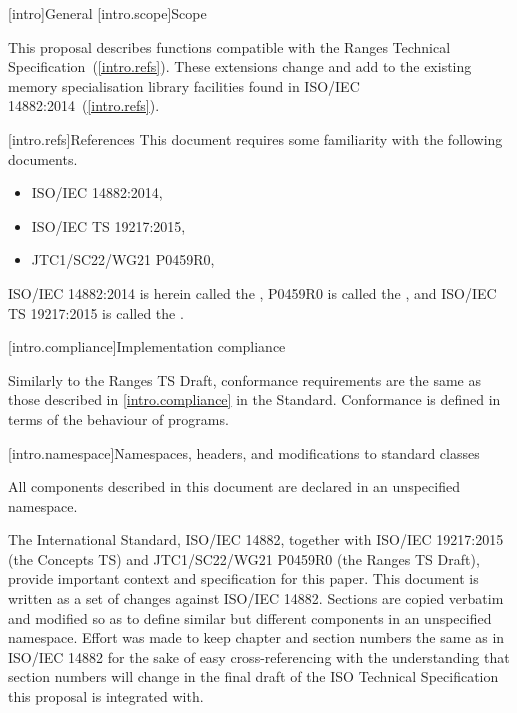 [intro]{General}
[intro.scope]{Scope}

\pnum
This proposal describes functions compatible with the Ranges Technical
Specification~(\ref{intro.refs}). These extensions change and add to the existing
memory specialisation library facilities found in ISO/IEC 14882:2014~(\ref{intro.refs}).

[intro.refs]{References}
This document requires some familiarity with the following documents.

\begin{itemize}
\item ISO/IEC 14882:2014,   
\item ISO/IEC TS 19217:2015,  
\item JTC1/SC22/WG21 P0459R0, 
\end{itemize}

ISO/IEC 14882:2014 is herein called the , P0459R0 is called the ,
and ISO/IEC TS 19217:2015 is called the .

[intro.compliance]{Implementation compliance}

\pnum
Similarly to the Ranges TS Draft, conformance requirements are the same as those described in
\ref{intro.compliance} in the \Cpp Standard.
\enternote
Conformance is defined in terms of the behaviour of programs.
\exitnote

[intro.namespace]{Namespaces, headers, and modifications to standard classes}

\pnum
All components described in this document are declared in an unspecified namespace.


\pnum
The International Standard, ISO/IEC 14882, together with ISO/IEC 19217:2015 (the Concepts TS) and JTC1/SC22/WG21
P0459R0 (the Ranges TS Draft), provide important context and specification for this paper. This
document is written as a set of changes against ISO/IEC 14882. Sections are copied
verbatim and modified so as to define similar but different components in
an unspecified namespace. Effort was made to keep
chapter and section numbers the same as in ISO/IEC 14882 for the sake of easy
cross-referencing with the understanding that section numbers will change in
the final draft of the ISO Technical Specification this proposal is integrated with.

